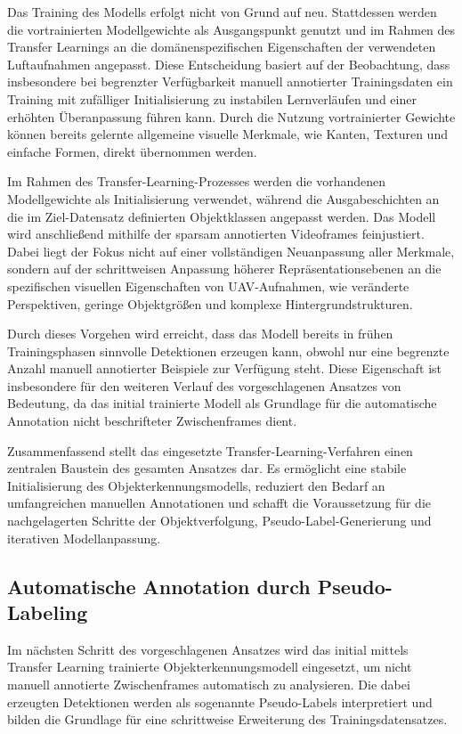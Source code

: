 Das Training des Modells erfolgt nicht von Grund auf neu. Stattdessen werden die 
vortrainierten Modellgewichte als Ausgangspunkt genutzt und im Rahmen des Transfer 
Learnings an die domänenspezifischen Eigenschaften der verwendeten Luftaufnahmen 
angepasst. Diese Entscheidung basiert auf der Beobachtung, dass insbesondere bei 
begrenzter Verfügbarkeit manuell annotierter Trainingsdaten ein Training mit 
zufälliger Initialisierung zu instabilen Lernverläufen und einer erhöhten 
Überanpassung führen kann. Durch die Nutzung vortrainierter Gewichte können bereits 
gelernte allgemeine visuelle Merkmale, wie Kanten, Texturen und einfache Formen, 
direkt übernommen werden.

Im Rahmen des Transfer-Learning-Prozesses werden die vorhandenen Modellgewichte als 
Initialisierung verwendet, während die Ausgabeschichten an die im Ziel-Datensatz 
definierten Objektklassen angepasst werden. Das Modell wird anschließend mithilfe 
der sparsam annotierten Videoframes feinjustiert. Dabei liegt der Fokus nicht auf 
einer vollständigen Neuanpassung aller Merkmale, sondern auf der schrittweisen 
Anpassung höherer Repräsentationsebenen an die spezifischen visuellen Eigenschaften 
von UAV-Aufnahmen, wie veränderte Perspektiven, geringe Objektgrößen und komplexe 
Hintergrundstrukturen.

Durch dieses Vorgehen wird erreicht, dass das Modell bereits in frühen 
Trainingsphasen sinnvolle Detektionen erzeugen kann, obwohl nur eine begrenzte 
Anzahl manuell annotierter Beispiele zur Verfügung steht. Diese Eigenschaft ist 
insbesondere für den weiteren Verlauf des vorgeschlagenen Ansatzes von Bedeutung, 
da das initial trainierte Modell als Grundlage für die automatische Annotation 
nicht beschrifteter Zwischenframes dient.

Zusammenfassend stellt das eingesetzte Transfer-Learning-Verfahren einen zentralen 
Baustein des gesamten Ansatzes dar. Es ermöglicht eine stabile Initialisierung des 
Objekterkennungsmodells, reduziert den Bedarf an umfangreichen manuellen 
Annotationen und schafft die Voraussetzung für die nachgelagerten Schritte der 
Objektverfolgung, Pseudo-Label-Generierung und iterativen Modellanpassung.

\subsection{Automatische Annotation durch Pseudo-Labeling}

Im nächsten Schritt des vorgeschlagenen Ansatzes wird das initial mittels Transfer 
Learning trainierte Objekterkennungsmodell eingesetzt, um nicht manuell annotierte 
Zwischenframes automatisch zu analysieren. Die dabei erzeugten Detektionen werden 
als sogenannte Pseudo-Labels interpretiert und bilden die Grundlage für eine 
schrittweise Erweiterung des Trainingsdatensatzes.

